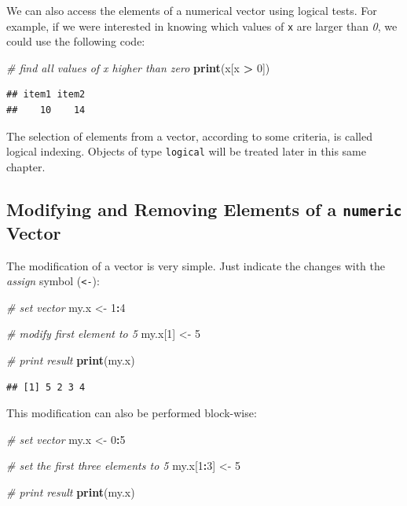 \documentclass[11pt,]{book}
\newenvironment{Shaded}{\begin{snugshade}}{\end{snugshade}}
\newcommand{\KeywordTok}[1]{\textcolor[rgb]{0.27,0.27,0.27}{\textbf{#1}}}
\newcommand{\DecValTok}[1]{\textcolor[rgb]{0.06,0.06,0.06}{#1}}
\newcommand{\StringTok}[1]{\textcolor[rgb]{0.5,0.5,0.5}{#1}}
\newcommand{\CommentTok}[1]{\textcolor[rgb]{0.56,0.35,0.01}{\textit{#1}}}
\newcommand{\OperatorTok}[1]{\textcolor[rgb]{0.81,0.36,0.00}{\textbf{#1}}}
\newcommand{\NormalTok}[1]{#1}
\begin{document}
We can also access the elements of a numerical vector using logical
tests. For example, if we were interested in knowing which values of
\texttt{x} are larger than \emph{0}, we could use the following code:

\begin{Shaded}
\begin{Highlighting}[]
\CommentTok{# find all values of x higher than zero}
\KeywordTok{print}\NormalTok{(x[x }\OperatorTok{>}\StringTok{ }\DecValTok{0}\NormalTok{])}
\end{Highlighting}
\end{Shaded}

\begin{verbatim}
## item1 item2 
##    10    14
\end{verbatim}

The selection of elements from a vector, according to some criteria, is
called logical indexing. Objects of type \texttt{logical} will be
treated later in this same chapter.

\subsection{\texorpdfstring{Modifying and Removing Elements of a
\texttt{numeric}
Vector}{Modifying and Removing Elements of a numeric Vector}}\label{modifying-and-removing-elements-of-a-numeric-vector}

The modification of a vector is very simple. Just indicate the changes
with the \emph{assign} symbol (\texttt{\textless{}-}): 

\begin{Shaded}
\begin{Highlighting}[]
\CommentTok{# set vector}
\NormalTok{my.x <-}\StringTok{ }\DecValTok{1}\OperatorTok{:}\DecValTok{4}

\CommentTok{# modify first element to 5}
\NormalTok{my.x[}\DecValTok{1}\NormalTok{] <-}\StringTok{ }\DecValTok{5}

\CommentTok{# print result}
\KeywordTok{print}\NormalTok{(my.x)}
\end{Highlighting}
\end{Shaded}

\begin{verbatim}
## [1] 5 2 3 4
\end{verbatim}

This modification can also be performed block-wise:

\begin{Shaded}
\begin{Highlighting}[]
\CommentTok{# set vector }
\NormalTok{my.x <-}\StringTok{ }\DecValTok{0}\OperatorTok{:}\DecValTok{5}

\CommentTok{# set the first three elements to 5}
\NormalTok{my.x[}\DecValTok{1}\OperatorTok{:}\DecValTok{3}\NormalTok{] <-}\StringTok{ }\DecValTok{5}

\CommentTok{# print result}
\KeywordTok{print}\NormalTok{(my.x)}
\end{Highlighting}
\end{Shaded}
\end{document}
